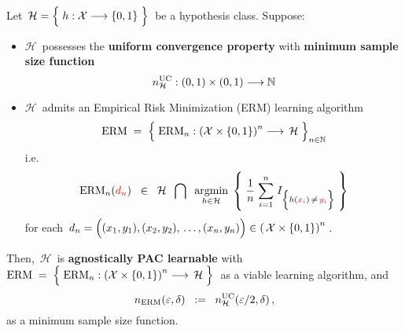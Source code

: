 \vskip 1.0cm
\begin{theorem}
\mbox{}\vskip 0.1cm
\noindent
Let
\,$\mathcal{H} = \left\{\; h : \mathcal{X} \overset{{\color{white}-}}{\longrightarrow} \{0,1\} \;\right\}$\,
be a hypothesis class.
\vskip 0.2cm
\noindent
Suppose:
\begin{itemize}
\item
	$\mathcal{H}$\, possesses the \textbf{uniform convergence property}
	with \textbf{minimum sample size function}
	\begin{equation*}
	n^{\textnormal{UC}}_{\mathcal{H}} : (0,1) \times (0,1) \longrightarrow \mathbb{N}
	\end{equation*}
\item
	$\mathcal{H}$\, admits an Empirical Risk Minimization (ERM) learning algorithm
	\begin{equation*}
	\textnormal{ERM} \;=\; \left\{\;
		\overset{{\color{white}.}}{\textnormal{ERM}_{n}} :
		\left(\mathcal{X}\times\{0,1\}\right)^{n} \longrightarrow \, \mathcal{H}
		\;\right\}_{n\in\N}
	\end{equation*}
	i.e.
	\begin{equation*}
	\textnormal{ERM}_{n}({\color{red}d_{n}})
	\;\; \in \;\;
		\mathcal{H}
		\;\; \bigcap \;\;
		\underset{h\in\mathcal{H}}{\argmin}\;\left\{\;
			\dfrac{1}{n}\;\overset{n}{\underset{i=1}{\sum}}\;
			I_{\left\{h({\color{red}x_{i}})\,\overset{{\color{white}.}}{\neq}\,{\color{red}y_{i}}\right\}}
			\;\right\}
	\end{equation*}
	for each
	\,$d_{n} = \left((x_{1},y_{1}),(x_{2},y_{2}),\,\overset{{\color{white}\vert}}{\ldots}\,,(x_{n},y_{n})\right)
	\in \left(\,\mathcal{X} \times \{0,1\} \right)^{n}$\,.
\end{itemize}
Then, \,$\mathcal{H}$\, is \textbf{agnostically PAC learnable} with
\,$\textnormal{ERM} \; = \;
	\left\{\;
		\overset{{\color{white}.}}{\textnormal{ERM}_{n}} :
		\left(\mathcal{X}\times\{0,1\}\right)^{n} \longrightarrow \, \mathcal{H}
		\;\right\}
$\,
as a viable learning algorithm, and
\begin{equation*}
n_{\textnormal{ERM}}(\varepsilon,\delta) \;\; := \;\; n^{\textnormal{UC}}_{\mathcal{H}}(\varepsilon/2,\delta)\,,
\end{equation*}
as a minimum sample size function.
\end{theorem}
\proof

